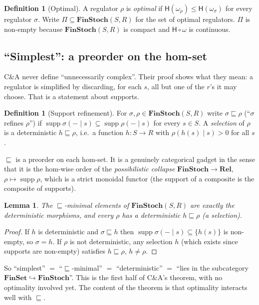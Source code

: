 \documentclass[11pt,a4paper]{article}
\newtheorem{lemma}[theorem]{Lemma}
\theoremstyle{definition}
\newtheorem{definition}[theorem]{Definition}
\theoremstyle{remark}
\newcommand{\FinSet}{\mathbf{FinSet}}
\newcommand{\Rel}{\mathbf{Rel}}
\newcommand{\FinStoch}{\mathbf{FinStoch}}
\newcommand{\supp}{\operatorname{supp}}
\newcommand{\ent}{\mathsf{H}}
\newcommand{\refines}{\sqsubseteq}
\begin{document}
\begin{definition}[Optimal]\label{def:optimal}
A regulator $\rho$ is \emph{optimal} if $\ent(\omega_\rho)\le\ent(\omega_\sigma)$ for every regulator $\sigma$. Write $\Pi\subseteq\FinStoch(S,R)$ for the set of optimal regulators. $\Pi$ is non-empty because $\FinStoch(S,R)$ is compact and $\ent\circ\omega$ is continuous.
\end{definition}

\subsection{``Simplest'': a preorder on the hom-set}

C\&A never define ``unnecessarily complex''. Their proof shows what they mean:
a regulator is simplified by discarding, for each $s$, all but one of the
$r$'s it may choose. That is a statement about supports.

\begin{definition}[Support refinement]\label{def:refine}
For $\sigma,\rho\in\FinStoch(S,R)$ write $\sigma\refines\rho$ (``$\sigma$ refines $\rho$'') if $\supp\sigma(-\mid s)\subseteq\supp\rho(-\mid s)$ for every $s\in S$. A \emph{selection} of $\rho$ is a deterministic $h\refines\rho$, i.e.\ a function $h\colon S\to R$ with $\rho(h(s)\mid s)>0$ for all $s$.
\end{definition}

$\refines$ is a preorder on each hom-set. It is a genuinely categorical gadget
in the sense that it is the hom-wise order of the \emph{possibilistic
collapse} $\FinStoch\to\Rel$, $\rho\mapsto\supp\rho$, which is a strict monoidal
functor (the support of a composite is the composite of supports).

\begin{lemma}\label{lem:minimal}
The $\refines$-minimal elements of $\FinStoch(S,R)$ are exactly the deterministic morphisms, and every $\rho$ has a deterministic $h\refines\rho$ (a selection).
\end{lemma}
\begin{proof}
If $h$ is deterministic and $\sigma\refines h$ then $\supp\sigma(-\mid s)\subseteq\{h(s)\}$ is non-empty, so $\sigma=h$. If $\rho$ is not deterministic, any selection $h$ (which exists since supports are non-empty) satisfies $h\refines\rho$, $h\neq\rho$.
\end{proof}

So ``simplest'' $=$ ``$\refines$-minimal'' $=$ ``deterministic'' $=$ ``lies in the subcategory $\FinSet\hookrightarrow\FinStoch$''. This is the first half of C\&A's theorem, with no optimality involved yet. The content of the theorem is that optimality interacts well with $\refines$.
\end{document}
